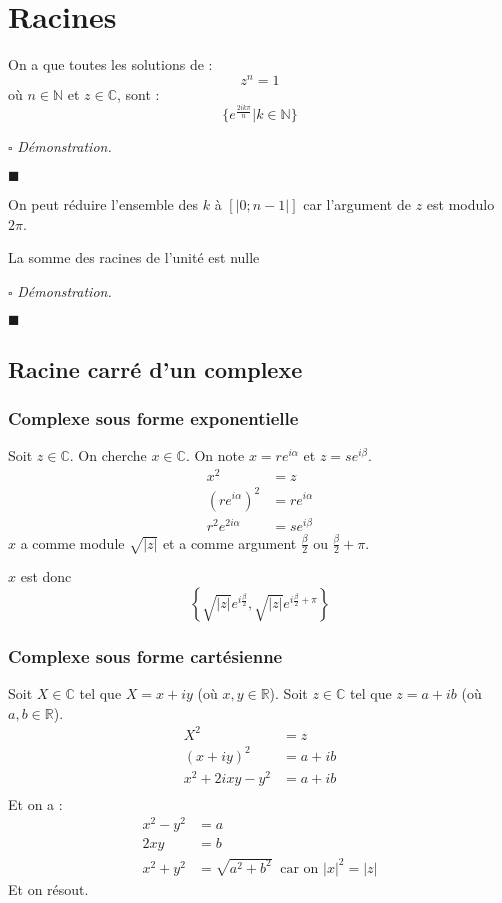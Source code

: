 \documentclass[a4paper, titlepage]{article}
\renewenvironment{proof}{$\square$ \footnotesize\textit{Démonstration.}}{\begin{flushright}$\blacksquare$\end{flushright}}
\begin{document}
	\section{Racines}
	\begin{thm}
		On a que toutes les solutions de :
		$$ z^n = 1 $$
		où $n\in\mathbb{N}$ et $z\in\mathbb{C}$, sont :
		$$ \{e^{\frac{2ik\pi}{n}}|k\in\mathbb{N}\} $$
	\end{thm}
	\begin{proof}
		\AQT
	\end{proof}
	On peut réduire l'ensemble des $k$ à $[|0;n-1|]$ car l'argument de $z$ est modulo $2\pi$.
	\begin{props}
		La somme des racines de l'unité est nulle
	\end{props}
	\begin{proof}
		\AQT
	\end{proof}
	\subsection{Racine carré d'un complexe}
	\subsubsection{Complexe sous forme exponentielle}
	Soit $z\in\mathbb{C}$. On cherche $x\in\mathbb{C}$. On note $x=re^{i\alpha}$ et $z=se^{i\beta}$.
	\begin{align*}
		x^2 &= z \\
		(re^{i\alpha})^2 &= re^{i\alpha} \\
		r^2e^{2i\alpha}	&= se^{i\beta}
	\end{align*}
	$x$ a comme module $\sqrt{|z|}$ et a comme argument $\frac{\beta}{2}$ ou $\frac{\beta}{2}+\pi$.

	$x$ est donc $$ \left\{ \sqrt{|z|}e^{i\frac{\beta}{2}},\sqrt{|z|}e^{i\frac{\beta}{2}+\pi} \right\}  $$
	\subsubsection{Complexe sous forme cartésienne}
	Soit $X\in\mathbb{C}$ tel que $X=x+iy$ (où $x,y\in\mathbb{R}$). Soit $z\in\mathbb{C}$ tel que $z=a+ib$ (où $a,b\in\mathbb{R}$).
	\begin{align*}
		X^2&= z \\
		(x+iy)^2&= a+ib \\
		x^2+2ixy-y^2 &= a+ib \\
	\end{align*}
	Et on a :
	\begin{align*}
		x^2-y^2 &=a\\
		2xy &= b\\
		x^2+y^2 &= \sqrt{a^2+b^2}~\text{ car on $|x|^2=|z|$}
	\end{align*}
	Et on résout.
\end{document}
